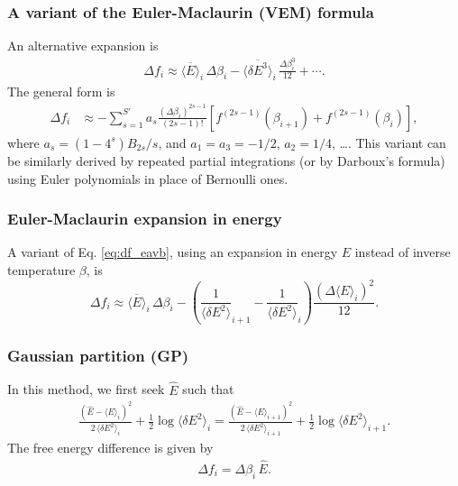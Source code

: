 \documentclass[aip,jcp,preprint,notitlepage, superscriptaddress]{revtex4-1}
\begin{document}
\subsubsection{A variant of the Euler-Maclaurin (VEM) formula}



An alternative expansion is
%
\begin{align}
\Delta f_i
\approx
\overline{ \langle E \rangle }_i \, \Delta \beta_i
-
\overline{ \langle \delta E^3 \rangle }_i
\, \frac{ \Delta \beta_i^3 } { 12 }
+ \cdots.
\label{eq:df_eavc}
\end{align}
%
The general form is
\begin{align*}
\Delta f_i
&\approx
-\sum_{s = 1}^{S'}
  a_s
  \frac{ (\Delta \beta_i)^{2s - 1} } { (2 s - 1)! }
  \left[
    f^{(2s-1)}(\beta_{i+1})
    +
    f^{(2s-1)}(\beta_i)
  \right],
\end{align*}
where
$a_s = (1 - 4^s) B_{2s} /s$,
%
and
$a_1 = a_3 = -1/2$,
$a_2 = 1/4$,
\dots.
%
This variant can be similarly derived
by repeated partial integrations
(or by Darboux's formula\cite{
whittaker, wang_specfunc})
using Euler polynomials\cite{
wang_specfunc, abramowitz}
in place of Bernoulli ones.



\subsubsection{Euler-Maclaurin expansion in energy}


A variant of Eq. \eqref{eq:df_eavb},
using an expansion in energy $E$
instead of inverse temperature $\beta$,
is
\begin{equation}
\Delta f_i
\approx
\overline{ \langle E \rangle }_i \, \Delta \beta_i
-
\left(
  \frac 1 { \langle \delta E^2 \rangle }_{i+1}
  -
  \frac 1 { \langle \delta E^2 \rangle }_{i}
\right)
\frac{ \left( \Delta \langle E \rangle_i \right)^2 }{ 12 }.
\label{eq:df_tgaus}
\end{equation}



\subsubsection{Gaussian partition (GP)}



In this method,
we first seek $\hat E$ such that
\begin{align}
  \frac{ (\hat E - \langle E \rangle_i)^2 }
  { 2 \, \langle \delta E^2 \rangle_i }
  +\frac 1 2
  \log
  \langle \delta E^2 \rangle_i
=
  \frac{ (\hat E - \langle E \rangle_{i+1})^2 }
  { 2 \, \langle \delta E^2 \rangle_{i+1} }
  +\frac 1 2
  \log
  \langle \delta E^2 \rangle_{i+1}.
  \label{eq:Ehat_gpart}
\end{align}
%
The free energy difference is given by
\begin{align}
  \Delta f_i = \Delta \beta_i \, \hat E.
  \label{eq:df_gpart}
\end{align}
%
\end{document}
